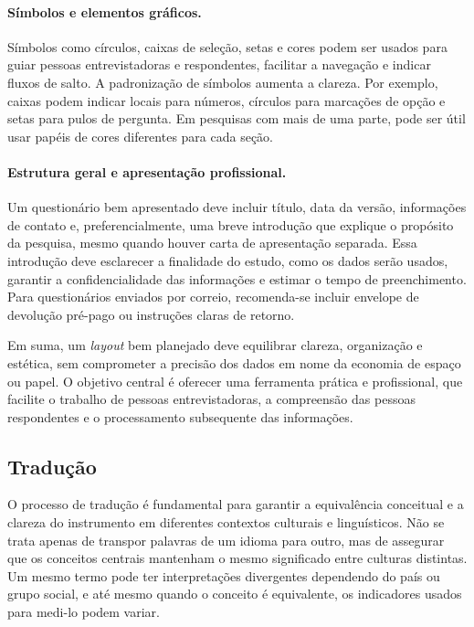 \documentclass[12pt, a4paper, openany]{book}
\begin{document}
\paragraph{S\'imbolos e elementos gr\'aficos.} S\'imbolos como c\'irculos, caixas de sele\c{c}\~ao, setas e cores podem ser usados para guiar pessoas entrevistadoras e respondentes, facilitar a navega\c{c}\~ao e indicar fluxos de salto. A padroniza\c{c}\~ao de s\'imbolos aumenta a clareza. Por exemplo, caixas podem indicar locais para n\'umeros, c\'irculos para marca\c{c}\~oes de op\c{c}\~ao e setas para pulos de pergunta. Em pesquisas com mais de uma parte, pode ser \'util usar pap\'eis de cores diferentes para cada se\c{c}\~ao.

\paragraph{Estrutura geral e apresenta\c{c}\~ao profissional.} Um question\'ario bem apresentado deve incluir t\'itulo, data da vers\~ao, informa\c{c}\~oes de contato e, preferencialmente, uma breve introdu\c{c}\~ao que explique o prop\'osito da pesquisa, mesmo quando houver carta de apresenta\c{c}\~ao separada. Essa introdu\c{c}\~ao deve esclarecer a finalidade do estudo, como os dados ser\~ao usados, garantir a confidencialidade das informa\c{c}\~oes e estimar o tempo de preenchimento. Para question\'arios enviados por correio, recomenda-se incluir envelope de devolu\c{c}\~ao pr\'e-pago ou instru\c{c}\~oes claras de retorno.

Em suma, um \textit{layout} bem planejado deve equilibrar clareza, organiza\c{c}\~ao e est\'etica, sem comprometer a precis\~ao dos dados em nome da economia de espa\c{c}o ou papel. O objetivo central \'e oferecer uma ferramenta pr\'atica e profissional, que facilite o trabalho de pessoas entrevistadoras, a compreens\~ao das pessoas respondentes e o processamento subsequente das informa\c{c}\~oes.

\subsection{Tradu\c{c}\~ao}

O processo de tradu\c{c}\~ao \'e fundamental para garantir a equival\^encia conceitual e a clareza do instrumento em diferentes contextos culturais e lingu\'isticos. N\~ao se trata apenas de transpor palavras de um idioma para outro, mas de assegurar que os conceitos centrais mantenham o mesmo significado entre culturas distintas. Um mesmo termo pode ter interpreta\c{c}\~oes divergentes dependendo do pa\'is ou grupo social, e at\'e mesmo quando o conceito \'e equivalente, os indicadores usados para medi-lo podem variar.
\end{document}

